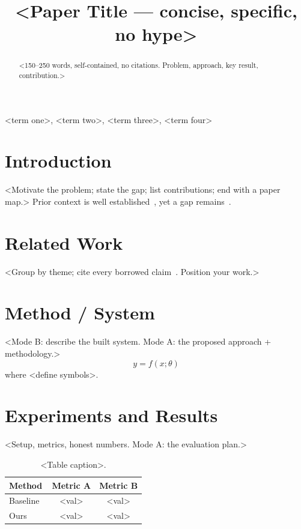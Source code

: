 \documentclass[conference]{IEEEtran}
\begin{document}
\title{<Paper Title — concise, specific, no hype>}

\author{
}

\maketitle

\begin{abstract}
<150--250 words, self-contained, no citations. Problem, approach, key result, contribution.>
\end{abstract}

\begin{IEEEkeywords}
<term one>, <term two>, <term three>, <term four>
\end{IEEEkeywords}

\section{Introduction}
<Motivate the problem; state the gap; list contributions; end with a paper map.> Prior
context is well established~\cite{ref1}, yet a gap remains~\cite{ref2}.

\section{Related Work}
<Group by theme; cite every borrowed claim~\cite{ref1,ref3}. Position your work.>

\section{Method / System}
<Mode B: describe the built system. Mode A: the proposed approach + methodology.>
\begin{equation}
\label{eq:model}
y = f(x;\theta)
\end{equation}
where <define symbols>.


\section{Experiments and Results}
<Setup, metrics, honest numbers. Mode A: the evaluation plan.>
\begin{table}[t]
\caption{<Table caption>.}
\label{tab:results}
\centering
\begin{tabular}{lcc}
\toprule
Method & Metric A & Metric B \\
\midrule
Baseline~\cite{ref3} & <val> & <val> \\
Ours & <val> & <val> \\
\bottomrule
\end{tabular}
\end{table}
\end{document}
